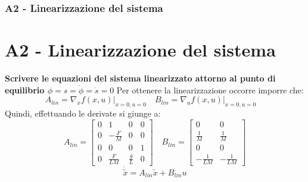 \documentclass{beamer}
\begin{document}
\begin{frame}
	\frametitle{A2 - Linearizzazione del sistema} %
	\section{A2 - Linearizzazione del sistema} %
	\textbf{Scrivere le equazioni del sistema linearizzato attorno al punto di equilibrio \(\phi=s=\dot{\phi}=\dot{s}=0\)}
	Per ottenere la linearizzazione occorre imporre che:\begin{equation*}
		A_{lin}=\nabla_{x}f(x,u)\lvert_{x=0,u=0}\quad
		B_{lin}=\nabla_{u}f(x,u)\lvert_{x=0,u=0}\quad
	\end{equation*}
	Quindi, effettuando le derivate si giunge a:
	\begin{equation*}
		A_{lin}=\begin{bmatrix}
			0 & 1            & 0           & 0 \\
			0 & -\frac{F}{M} & 0           & 0 \\
			0 & 0            & 0           & 1 \\
			0 & \frac{F}{LM} & \frac{g}{L} & 0
		\end{bmatrix}
		\quad B_{lin}=\begin{bmatrix}
			0 & 0 \\\frac{1}{M}&\frac{1}{M}\\0&0\\-\frac{1}{LM}&-\frac{1}{LM}
		\end{bmatrix}
	\end{equation*}
	\begin{equation*}
		\dot{\tilde{x}}=A_{lin}\tilde{x}+B_{lin}u
	\end{equation*}
\end{frame}
\end{document}
